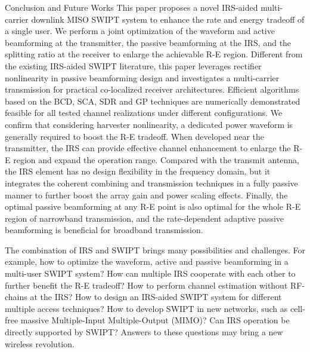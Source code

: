 \documentclass[journal]{IEEEtran}
\begin{document}
	\begin{section}{Conclusion and Future Works}\label{se:conclusion_and_future_works}
		This paper proposes a novel IRS-aided multi-carrier downlink MISO SWIPT system to enhance the rate and energy tradeoff of a single user. We perform a joint optimization of the waveform and active beamforming at the transmitter, the passive beamforming at the IRS, and the splitting ratio at the receiver to enlarge the achievable R-E region. Different from the existing IRS-aided SWIPT literature, this paper leverages rectifier nonlinearity in passive beamforming design and investigates a multi-carrier transmission for practical co-localized receiver architectures. Efficient algorithms based on the BCD, SCA, SDR and GP techniques are numerically demonstrated feasible for all tested channel realizations under different configurations. We confirm that considering harvester nonlinearity, a dedicated power waveform is generally required to boost the R-E tradeoff. When developed near the transmitter, the IRS can provide effective channel enhancement to enlarge the R-E region and expand the operation range. Compared with the transmit antenna, the IRS element has no design flexibility in the frequency domain, but it integrates the coherent combining and transmission techniques in a fully passive manner to further boost the array gain and power scaling effects. Finally, the optimal passive beamforming at any R-E point is also optimal for the whole R-E region of narrowband transmission, and the rate-dependent adaptive passive beamforming is beneficial for broadband transmission.

		The combination of IRS and SWIPT brings many possibilities and challenges. For example, how to optimize the waveform, active and passive beamforming in a multi-user SWIPT system? How can multiple IRS cooperate with each other to further benefit the R-E tradeoff? How to perform channel estimation without RF-chains at the IRS? How to design an IRS-aided SWIPT system for different multiple access techniques? How to develop SWIPT in new networks, such as cell-free massive Multiple-Input Multiple-Output (MIMO)? Can IRS operation be directly supported by SWIPT? Answers to these questions may bring a new wireless revolution.
	\end{section}


	
	
\end{document}
